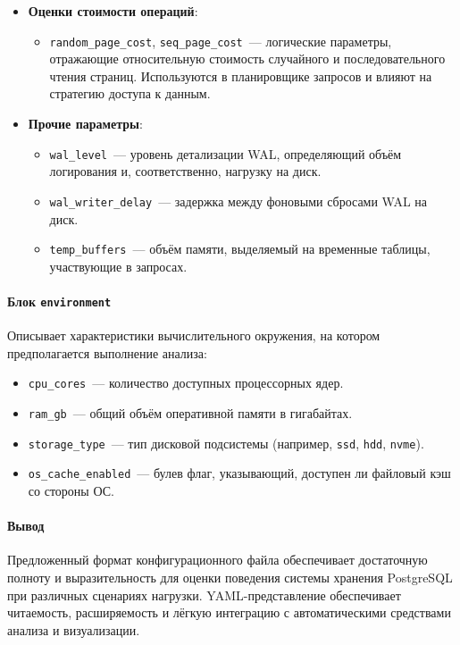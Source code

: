 \begin{itemize}
  \item \textbf{Оценки стоимости операций}:
    \begin{itemize}
      \item \texttt{random\_page\_cost}, \texttt{seq\_page\_cost}~--- логические параметры, отражающие относительную стоимость случайного и последовательного чтения страниц. Используются в планировщике запросов и влияют на стратегию доступа к данным.
    \end{itemize}

  \item \textbf{Прочие параметры}:
    \begin{itemize}
      \item \texttt{wal\_level}~--- уровень детализации WAL, определяющий объём логирования и, соответственно, нагрузку на диск.
      \item \texttt{wal\_writer\_delay}~--- задержка между фоновыми сбросами WAL на диск.
      \item \texttt{temp\_buffers}~--- объём памяти, выделяемый на временные таблицы, участвующие в запросах.
    \end{itemize}
\end{itemize}

\paragraph{Блок \texttt{environment}}

Описывает характеристики вычислительного окружения, на котором предполагается выполнение анализа:

\begin{itemize}
  \item \texttt{cpu\_cores}~--- количество доступных процессорных ядер.
  \item \texttt{ram\_gb}~--- общий объём оперативной памяти в гигабайтах.
  \item \texttt{storage\_type}~--- тип дисковой подсистемы (например, \texttt{ssd}, \texttt{hdd}, \texttt{nvme}).
  \item \texttt{os\_cache\_enabled}~--- булев флаг, указывающий, доступен ли файловый кэш со стороны ОС.
\end{itemize}

\paragraph{Вывод}

Предложенный формат конфигурационного файла обеспечивает достаточную полноту и выразительность для оценки поведения системы хранения PostgreSQL при различных сценариях нагрузки. YAML-представление обеспечивает читаемость, расширяемость и лёгкую интеграцию с автоматическими средствами анализа и визуализации.



